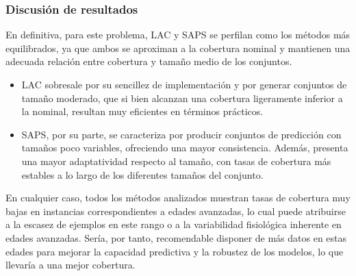
\subsubsection{Discusión de resultados}


En definitiva, para este problema, LAC y SAPS se perfilan como los métodos más equilibrados, ya que ambos se aproximan a la cobertura nominal y mantienen una adecuada relación entre cobertura y tamaño medio de los conjuntos.

\begin{itemize}

    \item LAC sobresale por su sencillez de implementación y por generar conjuntos de tamaño moderado, que si bien alcanzan una cobertura ligeramente inferior a la nominal, resultan muy eficientes en términos prácticos.
    
    \item SAPS, por su parte, se caracteriza por producir conjuntos de predicción con tamaños poco variables, ofreciendo una mayor consistencia. Además, presenta una mayor adaptatividad respecto al tamaño, con tasas de cobertura más estables a lo largo de los diferentes tamaños del conjunto. 
    
\end{itemize}

En cualquier caso, todos los métodos analizados muestran tasas de cobertura muy bajas en instancias correspondientes a edades avanzadas, lo cual puede atribuirse a la escasez de ejemplos en este rango o a la variabilidad fisiológica inherente en edades avanzadas. Sería, por tanto, recomendable disponer de más datos en estas edades para mejorar la capacidad predictiva y la robustez de los modelos, lo que llevaría a una mejor cobertura.




